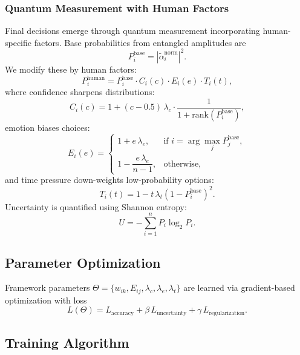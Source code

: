 \documentclass[conference]{IEEEtran}
\begin{document}
\subsubsection{Quantum Measurement with Human Factors}

Final decisions emerge through quantum measurement incorporating human-specific factors. Base probabilities from entangled amplitudes are
\begin{equation}
P_i^{\text{base}} = \left|\tilde{\alpha}_i^{\text{norm}}\right|^2.
\end{equation}
We modify these by human factors:
\begin{equation}
P_i^{\text{human}} = P_i^{\text{base}} \cdot C_i(c) \cdot E_i(e) \cdot T_i(t),
\end{equation}
where confidence sharpens distributions:
\begin{equation}
C_i(c) = 1 + (c - 0.5)\,\lambda_c \cdot \frac{1}{1 + \mathrm{rank}\!\left(P_i^{\text{base}}\right)},
\end{equation}
emotion biases choices:
\begin{equation}
E_i(e)=
\begin{cases}
1 + e\,\lambda_e, & \text{if } i = \arg\max_j P_j^{\text{base}},\\
1 - \dfrac{e\,\lambda_e}{n-1}, & \text{otherwise},
\end{cases}
\end{equation}
and time pressure down-weights low-probability options:
\begin{equation}
T_i(t) = 1 - t\,\lambda_t \left(1 - P_i^{\text{base}}\right)^2.
\end{equation}
Uncertainty is quantified using Shannon entropy:
\begin{equation}
U = -\sum_{i=1}^n P_i \log_2 P_i.
\end{equation}

\subsection{Parameter Optimization}

Framework parameters $\Theta = \{w_{ik}, E_{ij}, \lambda_c, \lambda_e, \lambda_t\}$ are learned via gradient-based optimization with loss
\begin{equation}
L(\Theta) = L_{\text{accuracy}} + \beta\,L_{\text{uncertainty}} + \gamma\,L_{\text{regularization}}.
\end{equation}

\subsection{Training Algorithm}
\end{document}
